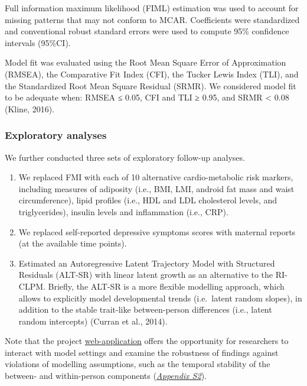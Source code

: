 \documentclass[
  letterpaper,
  DIV=11,
  numbers=noendperiod]{scrreport}
\providecommand{\tightlist}{%
  \setlength{\itemsep}{0pt}\setlength{\parskip}{0pt}}
\begin{document}
Full information maximum likelihood (FIML) estimation was used to
account for missing patterns that may not conform to MCAR. Coefficients
were standardized and conventional robust standard errors were used to
compute 95\% confidence intervals (95\%CI).

Model fit was evaluated using the Root Mean Square Error of
Approximation (RMSEA), the Comparative Fit Index (CFI), the Tucker Lewis
Index (TLI), and the Standardized Root Mean Square Residual (SRMR). We
considered model fit to be adequate when: RMSEA ≤ 0.05, CFI and TLI ≥
0.95, and SRMR \textless{} 0.08 (Kline, 2016).

\subsubsection{Exploratory analyses}\label{exploratory-analyses}

We further conducted three sets of exploratory follow-up analyses.

\begin{enumerate}
\def\labelenumi{\alph{enumi})}
\tightlist
\item
  We replaced FMI with each of 10 alternative cardio-metabolic risk
  markers, including measures of adiposity (i.e., BMI, LMI, android fat
  mass and waist circumference), lipid profiles (i.e., HDL and LDL
  cholesterol levels, and triglycerides), insulin levels and
  inflammation (i.e., CRP).
\item
  We replaced self-reported depressive symptoms scores with maternal
  reports (at the available time points).
\item
  Estimated an Autoregressive Latent Trajectory Model with Structured
  Residuals (ALT-SR) with linear latent growth as an alternative to the
  RI-CLPM. Briefly, the ALT-SR is a more flexible modelling approach,
  which allows to explicitly model developmental trends (i.e.~latent
  random slopes), in addition to the stable trait-like between-person
  differences (i.e., latent random intercepts) (Curran et al., 2014).
\end{enumerate}

Note that the project
\href{https://longit-comorbidity.onrender.com}{web-application} offers
the opportunity for researchers to interact with model settings and
examine the robustness of findings against violations of modelling
assumptions, such as the temporal stability of the between- and
within-person components (\href{https://osf.io/wyzd8}{\emph{Appendix
S2}}).
\end{document}
